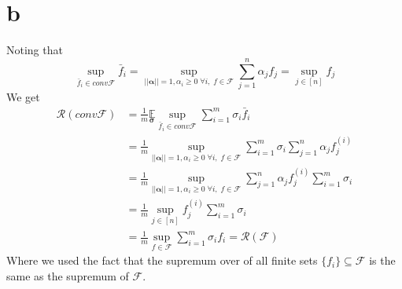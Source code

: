 \section*{b}
Noting that
\begin{equation*}    
    \underset{\bar{f}_i \in conv \mathcal{F}}{\sup} \bar{f}_i = \underset{||\pmb{\alpha}||=1, \alpha_i \geq 0 \; \forall i, \; f\in \mathcal{F}}{\sup} \sum_{j=1}^n \alpha_j f_j = \underset{j\in [n]}{\sup} f_j
\end{equation*}
We get
\begin{equation*}
    \begin{split}        
        \mathcal{R}(conv \mathcal{F}) &= \frac{1}{m} \underset{\pmb{\sigma}}{\mathbb{E}} \underset{\bar{f}_i \in conv \mathcal{F}}{\sup} \sum_{i=1}^m \sigma_i \bar{f}_i \\
        &= \frac{1}{m} \underset{||\pmb{\alpha}||=1, \alpha_i \geq 0 \; \forall i, \; f\in \mathcal{F}}{\sup} \sum_{i=1}^m \sigma_i \sum_{j=1}^n \alpha_j f_j^{(i)} \\
        &= \frac{1}{m} \underset{||\pmb{\alpha}||=1, \alpha_i \geq 0 \; \forall i, \; f\in \mathcal{F}}{\sup}  \sum_{j=1}^n \alpha_j f_j^{(i)} \sum_{i=1}^m \sigma_i \\
        &= \frac{1}{m} \underset{j\in [n]}{\sup} f_j^{(i)} \sum_{i=1}^m \sigma_i \\
        &= \frac{1}{m} \underset{f\in \mathcal{F}}{\sup} \sum_{i=1}^m \sigma_i f_i = \mathcal{R}(\mathcal{F})
    \end{split}
\end{equation*}
Where we used the fact that the supremum over of all finite sets $\{f_i\} \subseteq \mathcal{F}$ is the same as the supremum of $\mathcal{F}$.
